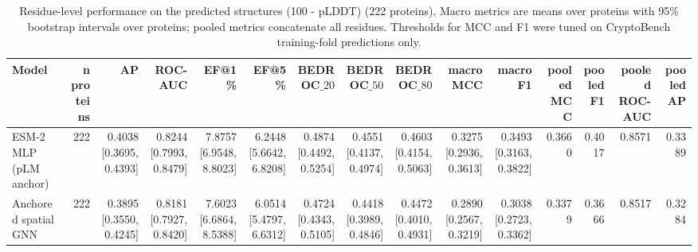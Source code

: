 \begin{table}[t]
\centering
\small
\caption{Residue-level performance on the predicted structures (100 - pLDDT) (222 proteins). Macro metrics are means over proteins with 95\% bootstrap intervals over proteins; pooled metrics concatenate all residues. Thresholds for MCC and F1 were tuned on CryptoBench training-fold predictions only.}
\label{tab:table_absolute}
\begin{tabular}{lrrrrrrrrrrrrrr}
\toprule
Model & n proteins & AP & ROC-AUC & EF@1\% & EF@5\% & BEDROC$\_{20}$ & BEDROC$\_{50}$ & BEDROC$\_{80}$ & macro MCC & macro F1 & pooled MCC & pooled F1 & pooled ROC-AUC & pooled AP \\
\midrule
ESM-2 MLP (pLM anchor) & 222 & 0.4038 [0.3695, 0.4393] & 0.8244 [0.7993, 0.8479] & 7.8757 [6.9548, 8.8023] & 6.2448 [5.6642, 6.8208] & 0.4874 [0.4492, 0.5254] & 0.4551 [0.4137, 0.4974] & 0.4603 [0.4154, 0.5063] & 0.3275 [0.2936, 0.3613] & 0.3493 [0.3163, 0.3822] & 0.3660 & 0.4017 & 0.8571 & 0.3389 \\
Anchored spatial GNN & 222 & 0.3895 [0.3550, 0.4245] & 0.8181 [0.7927, 0.8420] & 7.6023 [6.6864, 8.5388] & 6.0514 [5.4797, 6.6312] & 0.4724 [0.4343, 0.5105] & 0.4418 [0.3989, 0.4846] & 0.4472 [0.4010, 0.4931] & 0.2890 [0.2567, 0.3219] & 0.3038 [0.2723, 0.3362] & 0.3379 & 0.3666 & 0.8517 & 0.3284 \\
\bottomrule
\end{tabular}
\end{table}
